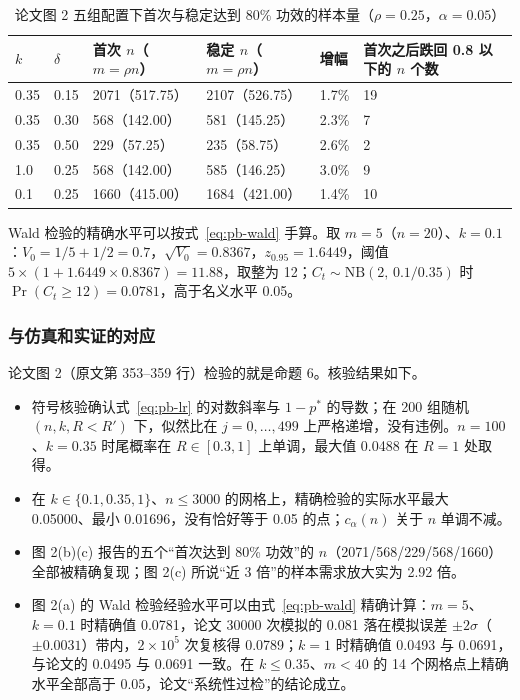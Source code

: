 \begin{table}[!tbp]\centering\small\caption{论文图 2 五组配置下首次与稳定达到 80\% 功效的样本量（$\rho=0.25$，$\alpha=0.05$）}\label{tab:pb-power}
\begin{tabular}{L{1.6cm}L{1.6cm}L{2.4cm}L{2.4cm}L{2.0cm}L{3.2cm}}
\toprule
$k$ & $\delta$ & 首次 $n$（$m=\rho n$） & 稳定 $n$（$m=\rho n$） & 增幅 & 首次之后跌回 0.8 以下的 $n$ 个数 \\
 & 0.15 & 2071（517.75） & 2107（526.75） & 1.7\% & 19 \\
0.35 & 0.30 & 568（142.00） & 581（145.25） & 2.3\% & 7 \\
0.35 & 0.50 & 229（57.25） & 235（58.75） & 2.6\% & 2 \\
1.0 & 0.25 & 568（142.00） & 585（146.25） & 3.0\% & 9 \\
0.1 & 0.25 & 1660（415.00） & 1684（421.00） & 1.4\% & 10 \\
\bottomrule
\end{tabular}
\end{table}

Wald 检验的精确水平可以按式~\eqref{eq:pb-wald} 手算。取 $m=5$（$n=20$）、$k=0.1$：$V_0=1/5+1/2=0.7$，$\sqrt{V_0}=0.8367$，$z_{0.95}=1.6449$，阈值 $5\times(1+1.6449\times0.8367)=11.88$，取整为 12；$C_t\sim\mathrm{NB}(2,\,0.1/0.35)$ 时 $\Pr(C_t\ge12)=0.0781$，高于名义水平 0.05。

\subsubsection{与仿真和实证的对应}

论文图 2（原文第 353–359 行）检验的就是命题 6。核验结果如下。
\begin{itemize}
\item 符号核验确认式~\eqref{eq:pb-lr} 的对数斜率与 $1-p^*$ 的导数；在 200 组随机 $(n,k,R<R')$ 下，似然比在 $j=0,\dots,499$ 上严格递增，没有违例。$n=100$、$k=0.35$ 时尾概率在 $R\in[0.3,1]$ 上单调，最大值 0.0488 在 $R=1$ 处取得。
\item 在 $k\in\{0.1,0.35,1\}$、$n\le3000$ 的网格上，精确检验的实际水平最大 0.05000、最小 0.01696，没有恰好等于 0.05 的点；$c_\alpha(n)$ 关于 $n$ 单调不减。
\item 图 2(b)(c) 报告的五个“首次达到 80\% 功效”的 $n$（2071/568/229/568/1660）全部被精确复现；图 2(c) 所说“近 3 倍”的样本需求放大实为 2.92 倍。
\item 图 2(a) 的 Wald 检验经验水平可以由式~\eqref{eq:pb-wald} 精确计算：$m=5$、$k=0.1$ 时精确值 0.0781，论文 30000 次模拟的 0.081 落在模拟误差 $\pm2\sigma$（$\pm0.0031$）带内，$2\times10^5$ 次复核得 0.0789；$k=1$ 时精确值 0.0493 与 0.0691，与论文的 0.0495 与 0.0691 一致。在 $k\le0.35$、$m<40$ 的 14 个网格点上精确水平全部高于 0.05，论文“系统性过检”的结论成立。
\end{itemize}

